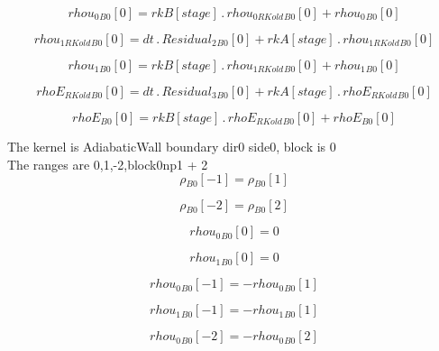 \documentclass{article}
\begin{document}
\begin{dmath}{rhou_{0}{_{B0}}}[{0}] = {rkB}[{stage}] \,.\, {rhou_{0 RKold}{_{B0}}}[{0}] + {rhou_{0}{_{B0}}}[{0}]\end{dmath}

\begin{dmath}{rhou_{1 RKold}{_{B0}}}[{0}] = dt \,.\, {Residual_{2}{_{B0}}}[{0}] + {rkA}[{stage}] \,.\, {rhou_{1 RKold}{_{B0}}}[{0}]\end{dmath}

\begin{dmath}{rhou_{1}{_{B0}}}[{0}] = {rkB}[{stage}] \,.\, {rhou_{1 RKold}{_{B0}}}[{0}] + {rhou_{1}{_{B0}}}[{0}]\end{dmath}

\begin{dmath}{rhoE_{RKold}{_{B0}}}[{0}] = dt \,.\, {Residual_{3}{_{B0}}}[{0}] + {rkA}[{stage}] \,.\, {rhoE_{RKold}{_{B0}}}[{0}]\end{dmath}

\begin{dmath}{rhoE{_{B0}}}[{0}] = {rkB}[{stage}] \,.\, {rhoE_{RKold}{_{B0}}}[{0}] + {rhoE{_{B0}}}[{0}]\end{dmath}

\noindent The kernel is AdiabaticWall boundary dir0 side0, block is 0\\\noindent The ranges are 0,1,-2,block0np1 + 2\\\begin{dmath}{\rho{_{B0}}}[{-1}] = {\rho{_{B0}}}[{1}]\end{dmath}

\begin{dmath}{\rho{_{B0}}}[{-2}] = {\rho{_{B0}}}[{2}]\end{dmath}

\begin{dmath}{rhou_{0}{_{B0}}}[{0}] = 0\end{dmath}

\begin{dmath}{rhou_{1}{_{B0}}}[{0}] = 0\end{dmath}

\begin{dmath}{rhou_{0}{_{B0}}}[{-1}] = - {rhou_{0}{_{B0}}}[{1}]\end{dmath}

\begin{dmath}{rhou_{1}{_{B0}}}[{-1}] = - {rhou_{1}{_{B0}}}[{1}]\end{dmath}

\begin{dmath}{rhou_{0}{_{B0}}}[{-2}] = - {rhou_{0}{_{B0}}}[{2}]\end{dmath}
\end{document}
